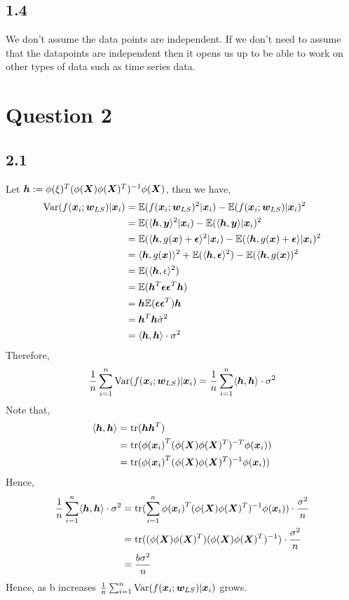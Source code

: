 \subsection*{1.4}
We don't assume the data points are independent. If we don't need to assume that the datapoints are independent then it opens us up to be able to work on other types of data such as time series data. 

\section*{Question 2}
\subsection*{2.1}
Let $\bm{h} := \phi(\xi)^{T} ({\phi(\bm{X})} {\phi(\bm{X})^{T}})^{-1} {\phi(\bm{X})}$, then we have,
\begin{align}
    {\text{Var}}(f({\bm{x}_{i}} ; {\bm{w}_{LS}}) | {\bm{x}_{i}}) &{} = {\mathbb{E}}(f({\bm{x}_{i}} ; {\bm{w}_{LS}})^{2} |{\bm{x}_{i}}) - {\mathbb{E}}(f({\bm{x}_{i}};{\bm{w}_{LS}}) | {\bm{x}_{i}} )^{2} \\
    &= {\mathbb{E}}(\langle {\bm{h}} , {\bm{y}} \rangle^{2} | {\bm{x}_{i}}) - {\mathbb{E}}(\langle {\bm{h}}, {\bm{y}} \rangle | {\bm{x}_{i}})^{2} \\
    &= {\mathbb{E}}(\langle {\bm{h}} , g({\bm{x}}) + \bm{\epsilon} \rangle^{2} | {\bm{x}_{i}} ) - {\mathbb{E}}(\langle {\bm{h}}, g({\bm{x}}) + \bm{\epsilon} \rangle | {\bm{x}_{i}})^{2} \\
    &= \langle {\bm{h}}, g({\bm{x}}) \rangle^{2} + {\mathbb{E}}(\langle {\bm{h}}, \bm{\epsilon} \rangle^{2}) - {\mathbb{E}}(\langle {\bm{h}},g({\bm{x}}))^{2} \\
    &= {\mathbb{E}}(\langle {\bm{h}}, \epsilon \rangle^{2}) \\
    &= {\mathbb{E}}({\bm{h}}^{T} \bm{\epsilon} \bm{\epsilon}^{T} {\bm{h}}) \\
    &= {\bm{h}} {\mathbb{E}}(\bm{\epsilon} \bm{\epsilon}^{T}) {\bm{h}} \\
    &= {\bm{h}}^{T} {\bm{h}} \dot \sigma^{2} \\
    &= \langle {\bm{h}} , {\bm{h}} \rangle \cdot \sigma^{2}
\end{align}
Therefore,
\begin{equation}
    \frac{1}{n} \sum_{i=1}^{n} {\text{Var}}(f({\bm{x}_{i}};{\bm{w}_{LS}})| {\bm{x}_{i}}) = \frac{1}{n} \sum_{i=1}^{n} \langle {\bm{h}}, {\bm{h}} \rangle \cdot \sigma^{2}
\end{equation}
Note that, 
\begin{align}
    \langle {\bm{h}}, {\bm{h}} \rangle &{} = {\text{tr}}({\bm{h}} {\bm{h}}^{T}) \\
    &= {\text{tr}}({\phi(\bm{x}_{i})}^{T} ({\phi(\bm{X})} {\phi(\bm{X})^{T}})^{-T} {\phi(\bm{x}_{i})}) \\
    &= {\text{tr}}({\phi(\bm{x}_{i})}^{T} ({\phi(\bm{X})} {\phi(\bm{X})^{T}})^{-1} {\phi(\bm{x}_{i})}) 
\end{align}
Hence,
\begin{align}
    \frac{1}{n} \sum_{i=1}^{n} \langle {\bm{h}}, {\bm{h}} \rangle \cdot \sigma^{2} &{} = {\text{tr}}( \sum_{i=1}^{n} {\phi(\bm{x}_{i})}^{T} ({\phi(\bm{X})} {\phi(\bm{X})^{T}})^{-1} {\phi(\bm{x}_{i})}) \cdot \frac{\sigma^{2}}{n} \\
    &= {\text{tr}}( ({\phi(\bm{X})} {\phi(\bm{X})^{T}}) ({\phi(\bm{X})} {\phi(\bm{X})^{T}})^{-1} ) \cdot \frac{\sigma^{2}}{n} \\
    &= \frac{b \sigma^{2}}{n}
\end{align}
Hence, as b increases $\frac{1}{n} \sum_{i=1}^{n} {\text{Var}}(f({\bm{x}_{i}};{\bm{w}_{LS}})| {\bm{x}_{i}})$ grows. 

